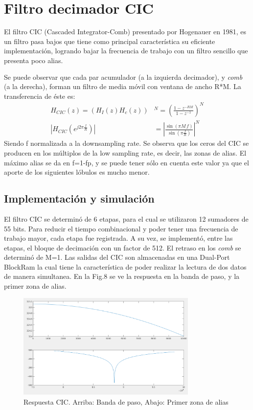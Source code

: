 \documentclass[a4paper,conference]{IEEEtran}
\begin{document}
\section{Filtro decimador CIC}
El filtro CIC (Cascaded Integrator-Comb) presentado por Hogenauer en 1981,  es un filtro pasa bajos que tiene como principal caracter\'istica su eficiente implementaci\'on, logrando bajar la frecuencia de trabajo con un filtro sencillo que presenta poco alias.

Se puede observar que cada par acumulador (a la izquierda decimador), y \textit{comb} (a la derecha), forman un filtro de media m\'ovil con ventana de ancho R*M. La transferencia de \'este es:
\begin{align}
H_{CIC}(z)= \left( H_I(z) H_c(z)\right)& ^{N}=\left( \frac{1-z^{-RM}}{1-z^{-1}}\right) ^N\\
\left| H_{CIC}(e^{j2\pi\frac{f}{R}})\right| &=\left| \frac{\sin(\pi M\,f)}{\sin(\pi \frac{f}{R})}\right| ^{N}
\end{align}
Siendo f normalizada a la downsampling rate.
Se observa que los ceros del CIC se producen en los m\'ultiplos de la low sampling rate, es decir, las zonas de alias. El m\'aximo alias se da en f=1-fp, y se puede tener s\'olo en cuenta este valor ya que el aporte de los siguientes l\'obulos es mucho menor.

\subsection{Implementaci\'on y simulaci\'on}
El filtro CIC se determin\'o de 6 etapas, para el cual se utilizaron 12 sumadores de 55 bits. Para reducir el tiempo combinacional y poder tener una frecuencia de trabajo mayor, cada etapa fue registrada. A su vez, se implement\'o, entre las etapas, el bloque de decimaci\'on con un factor de 512. El retraso en los \textit{comb} se determin\'o de M=1.  Las salidas del CIC son almacenadas en una Dual-Port BlockRam la cual tiene la caracter\'istica de poder realizar la lectura de dos datos de manera simultanea. En la Fig.8 se ve la respuesta en la banda de paso, y la primer zona de alias.

\begin{figure}[!t]
\centering
\includegraphics[width=3.5in]{Respuesta_CIC}
\caption{Respuesta CIC. Arriba: Banda de paso, Abajo: Primer zona de alias}
\label{fig_8}
\end{figure}
\end{document}

